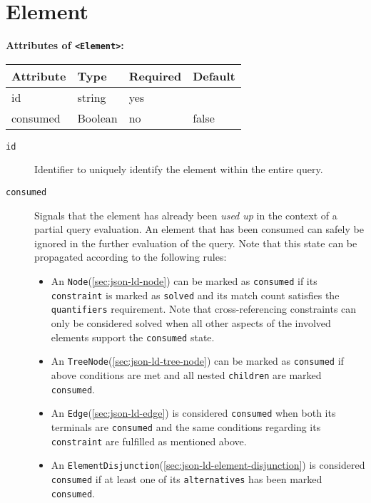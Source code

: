 \documentclass[11pt,a4paper]{report}
\newcommand{\iqlType}[1]{\texttt{\iqlns#1}}
\newcommand{\iqlBaseType}[1]{\texttt{\textless#1\textgreater}}
\newenvironment{attributes}[1]{
	\noindent\textbf{Attributes of #1:}\newline\medskip
	\begin{tabular}{|p{0.3\textwidth}|p{0.20\textwidth}|p{0.20\textwidth}|p{0.17\textwidth}|}
		\hline
		\textbf{Attribute} & \textbf{Type} & \textbf{Required} & \textbf{Default} \\ 
		\hline
		\hline
	}{
	\end{tabular}
}
\newcommand{\attribute}[4]{
	#1 & #2 & #3 & #4 \\
	\hline
}
\begin{document}
\section{Element}
\label{sec:json-ld-element}
\begin{attributes}{\iqlBaseType{Element}}
	\attribute{id}{string}{yes}{}
	\attribute{consumed}{Boolean}{no}{false}
\end{attributes}
\begin{description}
	\item[\iqlType{id}] Identifier to uniquely identify the element within the entire query.
	\item[\iqlType{consumed}] Signals that the element has already been \textit{used up} in the context of a partial query evaluation. An element that has been consumed can safely be ignored in the further evaluation of the query. Note that this state can be propagated according to the following rules:
	\begin{itemize}[leftmargin=*,topsep=0pt]\compresslist
		\item An \iqlType{Node}(\ref{sec:json-ld-node}) can be marked as \texttt{consumed} if its \iqlType{constraint} is marked as \texttt{solved} and its match count satisfies the \iqlType{quantifiers} requirement. Note that cross-referencing constraints can only be considered solved when all other aspects of the involved elements support the \texttt{consumed} state.
		\item An \iqlType{TreeNode}(\ref{sec:json-ld-tree-node}) can be marked as \texttt{consumed} if above conditions are met and all nested \iqlType{children} are marked \texttt{consumed}.
		\item An \iqlType{Edge}(\ref{sec:json-ld-edge}) is considered \texttt{consumed} when both its terminals are \texttt{consumed} and the same conditions regarding its \iqlType{constraint} are fulfilled as mentioned above.
		\item An \iqlType{ElementDisjunction}(\ref{sec:json-ld-element-disjunction}) is considered \texttt{consumed} if at least one of its \iqlType{alternatives} has been marked \texttt{consumed}.
	\end{itemize}
\end{description}
\end{document}
